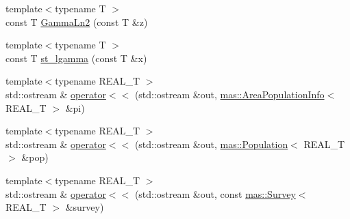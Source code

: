 \begin{DoxyCompactItemize}
\item 
{\footnotesize template$<$typename T $>$ }\\const T \hyperlink{namespacemas_a6e3cd532e642dd7393cd0f763abe986f}{Gamma\-Ln2} (const T \&z)
\item 
{\footnotesize template$<$typename T $>$ }\\const T \hyperlink{namespacemas_afa2e729fcb52d2aea6c536a066a793ff}{st\-\_\-lgamma} (const T \&x)
\item 
{\footnotesize template$<$typename R\-E\-A\-L\-\_\-\-T $>$ }\\std\-::ostream \& \hyperlink{namespacemas_aa949fb89fbd39fff01bd717d45aa9e26}{operator$<$$<$} (std\-::ostream \&out, \hyperlink{structmas_1_1_area_population_info}{mas\-::\-Area\-Population\-Info}$<$ R\-E\-A\-L\-\_\-\-T $>$ \&pi)
\item 
{\footnotesize template$<$typename R\-E\-A\-L\-\_\-\-T $>$ }\\std\-::ostream \& \hyperlink{namespacemas_a558c01ce026b5b66312dff3b4cc4c974}{operator$<$$<$} (std\-::ostream \&out, \hyperlink{classmas_1_1_population}{mas\-::\-Population}$<$ R\-E\-A\-L\-\_\-\-T $>$ \&pop)
\item 
{\footnotesize template$<$typename R\-E\-A\-L\-\_\-\-T $>$ }\\std\-::ostream \& \hyperlink{namespacemas_a5d80e62c70f81541b6d0cc321deb376c}{operator$<$$<$} (std\-::ostream \&out, const \hyperlink{structmas_1_1_survey}{mas\-::\-Survey}$<$ R\-E\-A\-L\-\_\-\-T $>$ \&survey)
\end{DoxyCompactItemize}


